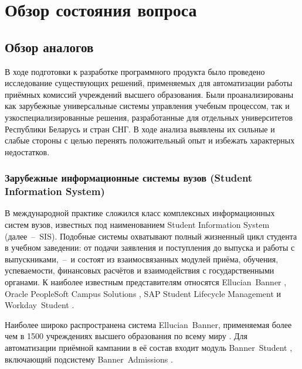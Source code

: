\section{Обзор состояния вопроса}

\subsection{Обзор аналогов}

В ходе подготовки к разработке программного продукта было проведено исследование существующих решений, применяемых для автоматизации работы приёмных комиссий учреждений высшего образования.
Были проанализированы как зарубежные универсальные системы управления учебным процессом, так и узкоспециализированные решения, разработанные для отдельных университетов Республики Беларусь и стран СНГ.
В ходе анализа выявлены их сильные и слабые стороны с целью перенять положительный опыт и избежать характерных недостатков.

\subsubsection{Зарубежные информационные системы вузов (Student Information System)}

В международной практике сложился класс комплексных информационных систем вузов, известных под наименованием Student Information System (далее~--~SIS).
Подобные системы охватывают полный жизненный цикл студента в учебном заведении: от подачи заявления и поступления до выпуска и работы с выпускниками,~--~и состоят из взаимосвязанных модулей приёма, обучения, успеваемости, финансовых расчётов и взаимодействия с государственными органами.
К наиболее известным представителям относятся Ellucian~Banner , Oracle PeopleSoft Campus Solutions , SAP Student Lifecycle Management  и Workday~Student .

Наиболее широко распространена система Ellucian~Banner, применяемая более чем в 1500 учреждениях высшего образования по всему миру .
Для автоматизации приёмной кампании в её состав входит модуль Banner~Student , включающий подсистему Banner~Admissions .

